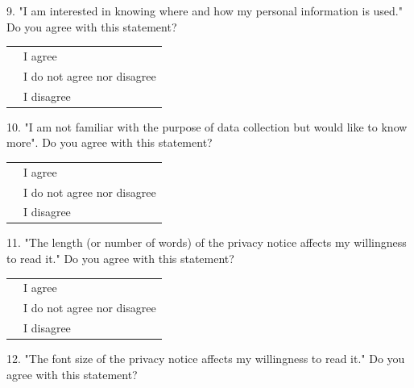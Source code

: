 9. "I am interested in knowing where and how my personal information is used." Do you agree with this statement?

\vspace{0.6cm}
\begin{center}
    \noindent\begin{tabularx}{0.8\textwidth}{ >{\centering\arraybackslash}X >{\raggedright\arraybackslash}X }
        {\huge $\circ$} & I agree \\[0.2cm]
        {\huge $\circ$} & I do not agree nor disagree \\[0.2cm]
        {\huge $\circ$} & I disagree
    \end{tabularx}
\end{center}
\vspace{0.6cm}

10. "I am not familiar with the purpose of data collection but would like to know more". Do you agree with this statement?

\vspace{0.6cm}
\begin{center}
    \noindent\begin{tabularx}{0.8\textwidth}{ >{\centering\arraybackslash}X >{\raggedright\arraybackslash}X }
        {\huge $\circ$} & I agree \\[0.2cm]
        {\huge $\circ$} & I do not agree nor disagree \\[0.2cm]
        {\huge $\circ$} & I disagree
    \end{tabularx}
\end{center}
\vspace{0.6cm}

11. "The length (or number of words) of the privacy notice affects my willingness to read it." Do you agree with this statement?

\vspace{0.6cm}
\begin{center}
    \noindent\begin{tabularx}{0.8\textwidth}{ >{\centering\arraybackslash}X >{\raggedright\arraybackslash}X }
        {\huge $\circ$} & I agree \\[0.2cm]
        {\huge $\circ$} & I do not agree nor disagree \\[0.2cm]
        {\huge $\circ$} & I disagree
    \end{tabularx}
\end{center}
\vspace{0.6cm}

12. "The font size of the privacy notice affects my willingness to read it." Do you agree with this statement?

